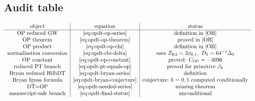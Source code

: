 \subsection{Audit table}

\[
\begin{array}{c|c|c}
\hbox{object} & \hbox{equation} & \hbox{status} \\
\hline
\hbox{OP reduced GW}
& \eqref{eq:opdt-op-series}
& \hbox{definition in }\cite{OB} \\
\hbox{OP theorem}
& \eqref{eq:opdt-op-theorem}
& \hbox{proved in }\cite[Theorem 1]{OB} \\
\hbox{OP product}
& \eqref{eq:opdt-op-chi}
& \hbox{definition in }\cite[(3)]{OB} \\
\hbox{normalisation conversion}
& \eqref{eq:opdt-chi-delta}
& \hbox{uses }Z_{\mathrm{K3}}=2\phi_{0,1},
\ D_5=64^{-1}\Delta_5 \\
\hbox{OP constant}
& \eqref{eq:opdt-op-constant}
& \hbox{proved: }C_{\mathrm{OP}}=-4096 \\
\hbox{reduced PT branch}
& \eqref{eq:opdt-pt-equals-op}
& \hbox{proved for primitive }\beta_h \\
\hbox{Bryan reduced HilbDT}
& \eqref{eq:opdt-bryan-series}
& \hbox{definition} \\
\hbox{Bryan Igusa formula}
& \eqref{eq:opdt-bryan-conjecture}
& \hbox{conjecture; }h=0,1\hbox{ computed conditionally} \\
\hbox{DT=OP}
& \eqref{eq:opdt-needed-series}
& \hbox{missing theorem} \\
\hbox{manuscript-safe branch}
& \eqref{eq:opdt-final-status}
& \hbox{unconditional}
\end{array}
\]
